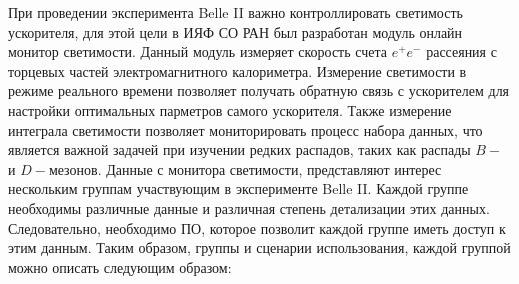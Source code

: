   При проведении эксперимента Belle II важно контроллировать светимость ускорителя, для этой цели в ИЯФ СО РАН был разработан модуль онлайн монитор светимости. Данный модуль измеряет скорость счета $e^+e^-$ рассеяния с торцевых частей электромагнитного калориметра. Измерение светимости в режиме реального времени позволяет получать обратную связь с ускорителем для настройки оптимальных парметров самого ускорителя. Также измерение интеграла светимости позволяет мониторировать процесс набора данных, что является важной задачей при изучении редких распадов, таких как распады $B-$ и $D-$мезонов.
  Данные с монитора светимости, представляют интерес нескольким группам участвующим в эксперименте Belle II. Каждой группе необходимы различные данные и различная степень детализации этих данных. Следовательно, необходимо ПО, которое позволит каждой группе иметь доступ к этим данным. Таким образом, группы и сценарии использования, каждой группой можно описать следующим образом:
